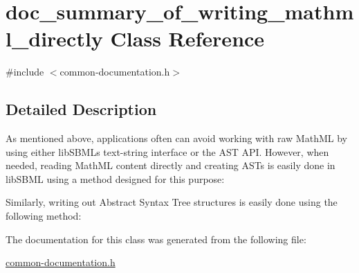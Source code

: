 \hypertarget{classdoc__summary__of__writing__mathml__directly}{}\section{doc\+\_\+summary\+\_\+of\+\_\+writing\+\_\+mathml\+\_\+directly Class Reference}
\label{classdoc__summary__of__writing__mathml__directly}


{\ttfamily \#include $<$common-\/documentation.\+h$>$}



\subsection{Detailed Description}
\begin{DoxyParagraph}{}
As mentioned above, applications often can avoid working with raw Math\+ML by using either lib\+S\+B\+ML\textquotesingle{}s text-\/string interface or the A\+ST A\+PI. However, when needed, reading Math\+ML content directly and creating A\+S\+Ts is easily done in lib\+S\+B\+ML using a method designed for this purpose\+:
\end{DoxyParagraph}
Similarly, writing out Abstract Syntax Tree structures is easily done using the following method\+: 

The documentation for this class was generated from the following file\+:\begin{DoxyCompactItemize}
\item 
\hyperlink{common-documentation_8h}{common-\/documentation.\+h}\end{DoxyCompactItemize}
